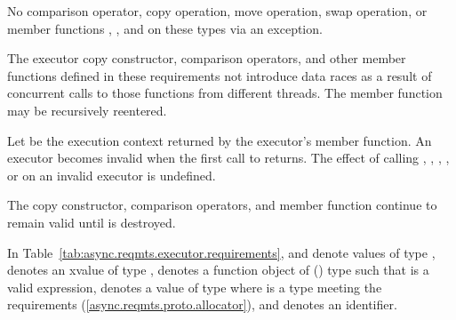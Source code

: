 \pnum
No comparison operator, copy operation, move operation, swap operation, or member functions , , and  on these types  via an exception.

\pnum
 The executor copy constructor, comparison operators, and other member functions defined in these requirements  not introduce data races as a result of concurrent calls to those functions from different threads.
The member function  may be recursively reentered.

\pnum
Let  be the execution context returned by the executor's  member function. An executor becomes invalid when the first call to  returns. The effect of calling , , , , or  on an invalid executor is undefined. \begin{note} The copy constructor, comparison operators, and  member function continue to remain valid until  is destroyed. \end{note}

\pnum
In Table~\ref{tab:async.reqmts.executor.requirements},
 and  denote  values of type  ,
 denotes an xvalue of type ,
 denotes a function object of  () type  such that  is a valid expression,
 denotes a  value of type  
where  is a type meeting the  requirements (\ref{async.reqmts.proto.allocator}),
and  denotes an identifier.

